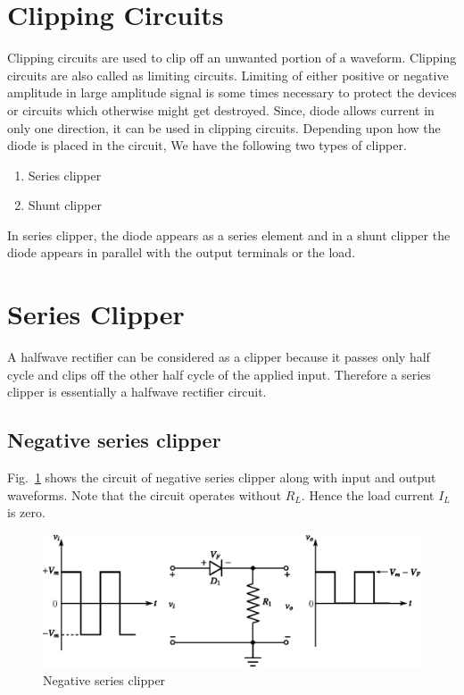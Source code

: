 \section{Clipping Circuits}\label{sec2.29}

Clipping circuits are used to clip off an unwanted portion of a waveform. Clipping circuits are also called as limiting circuits. Limiting of either positive or negative amplitude in large amplitude signal is some times necessary to protect the devices or circuits which otherwise might get destroyed. Since, diode allows current in only one direction, it can be used in clipping circuits. Depending upon how the diode is placed in the circuit, We have the following two types of clipper.
\begin{enumerate}
\item Series clipper

\item Shunt clipper
\end{enumerate}

In series clipper, the diode appears as a series element and in a shunt clipper the diode appears in parallel with the output terminals or the load.

\section{Series Clipper}\label{sec2.30}

A halfwave rectifier can be considered as a clipper because it passes only half cycle and clips off the other half cycle of the applied input. Therefore a series clipper is essentially a halfwave rectifier circuit.

\subsection{Negative series clipper}\label{sec2.30.1}

Fig.~\ref{fig2.25} shows the circuit of negative series clipper along with input and output waveforms. Note that the circuit operates without $R_{L}$. Hence the load current $I_{L}$ is zero.
\begin{figure}[H]
\centering
\includegraphics{chap2/fig2.25.eps}
\caption{Negative series clipper}\label{fig2.25}
\end{figure}

